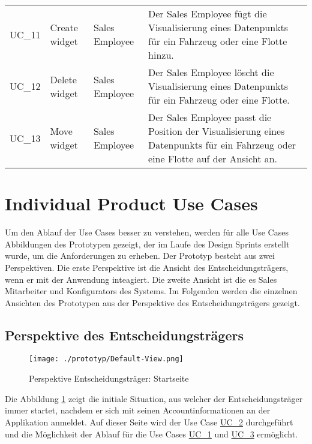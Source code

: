 \begin{footnotesize}
\begin{longtable}[i i i L]{ p{} p{} p{} p{} }
    \hypertarget{Ref:UC11}{UC\_11} & Create widget & Sales Employee & Der Sales Employee fügt die Visualisierung eines Datenpunkts für ein Fahrzeug oder eine Flotte hinzu. \\
    \hypertarget{Ref:UC12}{UC\_12} & Delete widget & Sales Employee & Der Sales Employee löscht die Visualisierung eines Datenpunkts für ein Fahrzeug oder eine Flotte. \\
    \hypertarget{Ref:UC13}{UC\_13} & Move widget & Sales Employee & Der Sales Employee passt die Position der Visualisierung eines Datenpunkts für ein Fahrzeug oder eine Flotte auf der Ansicht an. \\
    \bottomrule
  \end{longtable}
\end{footnotesize}
\rmfamily

\section{Individual Product Use Cases}
Um den Ablauf der Use Cases besser zu verstehen, werden für alle Use Cases Abbildungen des Prototypen gezeigt, der im Laufe des Design Sprints erstellt wurde, um die Anforderungen zu erheben. Der Prototyp besteht aus zwei Perspektiven. Die erste Perspektive ist die Ansicht des Entscheidungsträgers, wenn er mit der Anwendung inteagiert. Die zweite Ansicht ist die es Sales Mitarbeiter und Konfigurators des Systems. Im Folgenden werden die einzelnen Ansichten des Prototypen aus der Perspektive des Entscheidungsträgers gezeigt.


\subsection{Perspektive des Entscheidungsträgers}
\begin{figure}[H]
  \centering
  \texttt{[image: ./prototyp/Default-View.png]}
  \caption{Perspektive Entscheidungsträger: Startseite}
  \label{DecisionMaker:Homepage}
\end{figure}

Die Abbildung \ref{DecisionMaker:Homepage} zeigt die initiale Situation, aus welcher der Entscheidungsträger immer startet, nachdem er sich mit seinen Accountinformationen an der Applikation anmeldet. Auf dieser Seite wird der Use Case \hyperlink{Ref:UC2}{UC\_2} durchgeführt und die Möglichkeit der Ablauf für die Use Cases \hyperlink{Ref:UC1}{UC\_1} und \hyperlink{Ref:UC3}{UC\_3} ermöglicht. 


